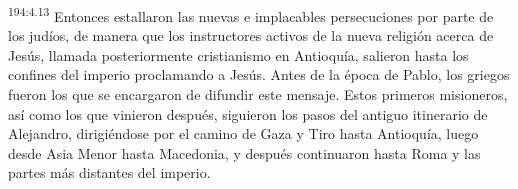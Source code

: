 \par 
\textsuperscript{194:4.13} Entonces estallaron las nuevas e implacables persecuciones por parte de los judíos, de manera que los instructores activos de la nueva religión acerca de Jesús, llamada posteriormente cristianismo en Antioquía, salieron hasta los confines del imperio proclamando a Jesús. Antes de la época de Pablo, los griegos fueron los que se encargaron de difundir este mensaje. Estos primeros misioneros, así como los que vinieron después, siguieron los pasos del antiguo itinerario de Alejandro, dirigiéndose por el camino de Gaza y Tiro hasta Antioquía, luego desde Asia Menor hasta Macedonia, y después continuaron hasta Roma y las partes más distantes del imperio.